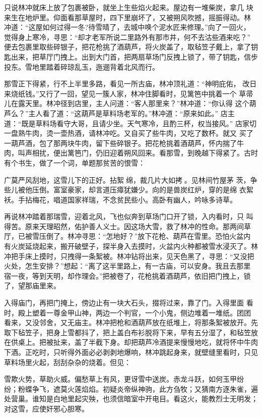 只说林冲就床上放了包裹被卧，就坐上生些焰火起来。屋边有一堆柴炭，拿几
块来生在地炉里。仰面看那草屋时，四下里崩坏了，又被朔风吹撼，摇振得动。林
冲道：“这屋如何过得一冬?待雪晴了，去城中唤个泥水匠来修理。”向了一回火，
觉得身上寒冷，寻思：“却才老军所说二里路外有那市井，何不去沽些酒来吃？”
便去包裹里取些碎银子，把花枪挑了酒葫芦，将火炭盖了，取毡笠子戴上，拿了钥
匙出来，把草厅门拽上。出到大门首，把两扇草场门反拽上锁了，带了钥匙，信步
投东。雪地里踏着碎琼乱玉，迤逦背着北风而行。

那雪正下得紧，行不上半里多路，看见一所古庙，林冲顶礼道：“神明庇佑，
改日来烧纸钱。”又行了一回，望见一簇人家，林冲住脚看时，见篱笆中挑着一个
草帚儿在露天里。林冲径到店里，主人问道：“客人那里来？”林冲道：“你认得
这个葫芦么？”主人看了道：“这葫芦是草料场老军的。”林冲道：“原来如此。”
店主道：“既是草料场看守大哥，且请少坐。天气寒冷，且酌三杯，权当接风。”
店家切一盘熟牛肉，烫一壶热酒，请林冲吃。又自买了些牛肉，又吃了数杯。就又
买了一葫芦酒，包了那两块牛肉，留下些碎银子。把花枪挑着酒葫芦，怀内揣了牛
肉，叫声相扰，便出篱笆门，仍旧迎着朔风回来。看那雪，到晚越下得紧了。古时
有个书生，做了一个词，单题那贫苦的恨雪：

广莫严风刮地，这雪儿下的正好。拈絮绵，裁几片大如拷。见林间竹屋茅
茨，争些儿被他压倒。富室豪家，却言道压瘴犹嫌少。向的是兽炭红炉，穿的是绵
衣絮袄。手拈梅花，唱道国家祥瑞，不念贫民些小。高卧有幽人，吟咏多诗草。

再说林冲踏着那瑞雪，迎着北风，飞也似奔到草场门口开了锁，入内看时，只
叫得苦。原来天理昭然，佑护善人义士。因这场大雪，救了林冲的性命。那两间草
厅，已被雪压倒了。林冲寻思：“怎地好？”放下花枪、葫芦在雪里。恐怕火盆内
有火炭延烧起来，搬开破壁子，探半身入去摸时，火盆内火种都被雪水浸灭了。林
冲把手床上摸时，只拽得一条絮被。林冲钻将出来，见天色黑了，寻思：“又没把
火处，怎生安排？”想起：“离了这半里路上，有一古庙，可以安身。我且去那里
宿一夜，等到天明，却作理会。”把被卷了，花枪挑着酒葫芦，依旧把门拽上，锁
了，望那庙里来。

入得庙门，再把门掩上，傍边止有一块大石头，掇将过来，靠了门。入得里面
看时，殿上塑着一尊金甲山神，两边一个判官，一个小鬼，侧边堆着一堆纸。团团
看来，又没邻舍，又无庙主。林冲把枪和酒葫芦放在纸堆上，将那条絮被放开。先
取下毡笠子，把身上雪都抖了，把上盖白布衫脱将下来，早有五分湿了，和毡笠放
在供桌上。把被扯来，盖了半截下身。却把葫芦冷酒提来慢慢地吃，就将怀中牛肉
下酒。正吃时，只听得外面必必剥剥地爆响，林冲跳起身来，就壁缝里看时，只见
草料场里火起，刮刮杂杂的烧着。但见：

雪欺火势，草助火威。偏愁草上有风，更讶雪中送炭。赤龙斗跃，如何玉甲纷
纷；粉蝶争飞，遮莫火莲焰焰。初疑炎帝纵神驹，此方刍牧；又猜南方逐朱雀，遍
处营巢。谁知是白地里起灾殃，也须信暗室中开电目。看这火，能教烈士无明发；
对这雪，应使奸邪心胆寒。

